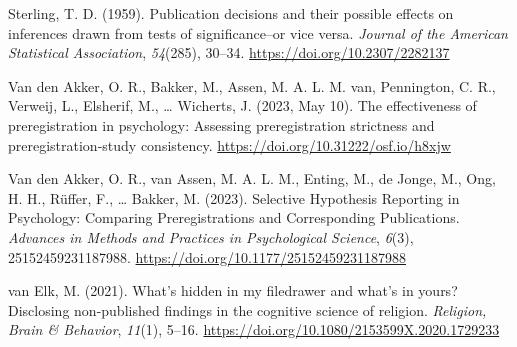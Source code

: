\documentclass[
  ,man, a4paper,floatsintext]{apa6}
\newlength{\cslhangindent}
\newenvironment{CSLReferences}[2] %
 {\begin{list}{}{%
  \setlength{\itemindent}{0pt}
  \setlength{\leftmargin}{0pt}
  \setlength{\parsep}{0pt}
  \ifodd #1
   \setlength{\leftmargin}{\cslhangindent}
   \setlength{\itemindent}{-1\cslhangindent}
  \fi
  \setlength{\itemsep}{#2\baselineskip}}}
 {\end{list}}
\begin{document}
\begin{CSLReferences}{1}{0}
Sterling, T. D. (1959). Publication decisions and their possible effects on inferences drawn from tests of significance--or vice versa. \emph{Journal of the American Statistical Association}, \emph{54}(285), 30--34. \url{https://doi.org/10.2307/2282137}

Van den Akker, O. R., Bakker, M., Assen, M. A. L. M. van, Pennington, C. R., Verweij, L., Elsherif, M., \ldots{} Wicherts, J. (2023, May 10). The effectiveness of preregistration in psychology: {Assessing} preregistration strictness and preregistration-study consistency. \url{https://doi.org/10.31222/osf.io/h8xjw}

Van den Akker, O. R., van Assen, M. A. L. M., Enting, M., de Jonge, M., Ong, H. H., Rüffer, F., \ldots{} Bakker, M. (2023). Selective {Hypothesis Reporting} in {Psychology}: {Comparing Preregistrations} and {Corresponding Publications}. \emph{Advances in Methods and Practices in Psychological Science}, \emph{6}(3), 25152459231187988. \url{https://doi.org/10.1177/25152459231187988}

van Elk, M. (2021). What's hidden in my filedrawer and what's in yours? {Disclosing} non-published findings in the cognitive science of religion. \emph{Religion, Brain \& Behavior}, \emph{11}(1), 5--16. \url{https://doi.org/10.1080/2153599X.2020.1729233}

\end{CSLReferences}

\endgroup
\end{document}
